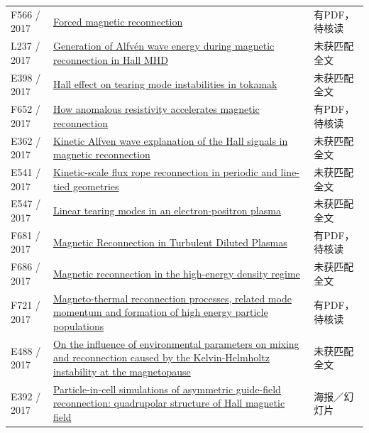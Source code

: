 \begin{longtable}{P{24mm}P{97mm}P{27mm}}
F566 / 2017 & \href{https://doi.org/10.1017/s0022377817000782}{Forced magnetic reconnection} & 有PDF，待核读\\

L237 / 2017 & \href{https://doi.org/10.1088/2058-6272/aa7c17}{Generation of Alfvén wave energy during magnetic reconnection in Hall MHD} & 未获匹配全文\\

E398 / 2017 & \href{https://doi.org/10.1063/1.5004430}{Hall effect on tearing mode instabilities in tokamak} & 未获匹配全文\\

F652 / 2017 & \href{https://doi.org/10.1063/1.5000071}{How anomalous resistivity accelerates magnetic reconnection} & 有PDF，待核读\\

E362 / 2017 & \href{http://ui.adsabs.harvard.edu/abs/2017AGUFMSM13B2376D/abstract}{Kinetic Alfven wave explanation of the Hall signals in magnetic reconnection} & 未获匹配全文\\

E541 / 2017 & \href{https://doi.org/10.1063/1.5007860}{Kinetic-scale flux rope reconnection in periodic and line-tied geometries} & 未获匹配全文\\

E547 / 2017 & \href{https://doi.org/10.1088/2058-6272/aa5801}{Linear tearing modes in an electron-positron plasma} & 未获匹配全文\\

F681 / 2017 & \href{https://doi.org/10.48550/arxiv.1703.01238}{Magnetic Reconnection in Turbulent Diluted Plasmas} & 有PDF，待核读\\

F686 / 2017 & \href{https://doi.org/10.1088/1361-6587/aa6803}{Magnetic reconnection in the high-energy density regime} & 未获匹配全文\\

F721 / 2017 & \href{https://doi.org/10.1088/1741-4326/aa6c70}{Magneto-thermal reconnection processes,  related mode momentum and formation of high energy particle populations} & 有PDF，待核读\\

E488 / 2017 & \href{https://doi.org/10.1063/1.4974758}{On the influence of environmental parameters on mixing and reconnection caused by the Kelvin-Helmholtz instability at the magnetopause} & 未获匹配全文\\

E392 / 2017 & \href{http://urlib.net/sid.inpe.br/mtc-m21b/2017/12.21.17.31}{Particle-in-cell simulations of asymmetric guide-field reconnection: quadrupolar structure of Hall magnetic field} & 海报／幻灯片\\


\end{longtable}
